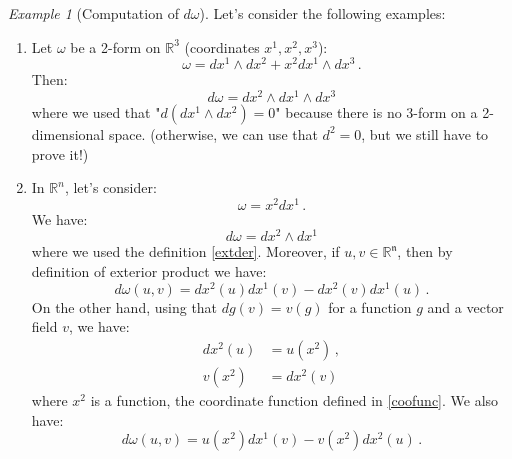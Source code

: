 \documentclass[a4paper,11pt,titlepage, article, oneside]{memoir}
\numberwithin{equation}{section}
\theoremstyle{definition}
\theoremstyle{remark}
\newtheorem{example}[theorem]{Example}
\newcommand{\rfield}{\mathbb{R}}
\begin{document}
\begin{tcolorbox}\begin{example}[Computation of $d\omega$]
  Let's consider the following examples:
  \begin{enumerate}
    \item Let $\omega$ be a 2-form on $\rfield^3$ (coordinates $x^1, x^2, x^3$):
    $$\omega = dx^1 \wedge dx^2 + x^2 dx^1 \wedge dx^3\, .$$
    Then:
    $$d \omega = dx^2 \wedge dx^1 \wedge dx^3$$
    where we used that "$d (dx^1 \wedge dx^2) = 0$" because there is no 3-form on a 2-dimensional space. (otherwise, we can use that $d^2=0$, but we still have to prove it!)
    \item In $\rfield^n$, let's consider:
    $$\omega = x^2 dx^1 \, .$$
    We have:
    $$ d \omega = dx^2 \wedge dx^1$$
    where we used the definition \ref{extder}. Moreover, if $u,v \in \mathfrak{\rfield^n}$, then by definition of exterior product we have:
    $$d \omega (u, v) = dx^2(u)dx^1(v) - dx^2(v)dx^1(u)\, .$$
    On the other hand, using that $d g(v) = v(g)$ for a function $g$ and a vector field $v$, we have:
    \begin{align*}
    dx^2(u)&=u(x^2)\, , \\ 
    v(x^2) &= dx^2(v)
    \end{align*}
where $x^2$ is a function, the coordinate function defined in \eqref{coofunc}. We also have:
    $$d \omega (u, v) = u(x^2)dx^1(v) - v(x^2)dx^2(u) \, .$$
  \end{enumerate}
\end{example}\end{tcolorbox}
\end{document}
